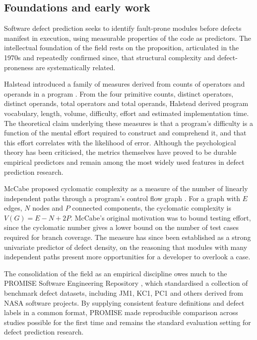 \documentclass[12pt,a4paper,oneside]{report}
\begin{document}
\subsection{Foundations and early work}

Software defect prediction seeks to identify fault-prone modules before defects manifest in execution, using measurable properties of the code as predictors. The intellectual foundation of the field rests on the proposition, articulated in the 1970s and repeatedly confirmed since, that structural complexity and defect-proneness are systematically related.

Halstead introduced a family of measures derived from counts of operators and operands in a program \cite{halstead1977}. From the four primitive counts, distinct operators, distinct operands, total operators and total operands, Halstead derived program vocabulary, length, volume, difficulty, effort and estimated implementation time. The theoretical claim underlying these measures is that a program's difficulty is a function of the mental effort required to construct and comprehend it, and that this effort correlates with the likelihood of error. Although the psychological theory has been criticised, the metrics themselves have proved to be durable empirical predictors and remain among the most widely used features in defect prediction research.

McCabe proposed cyclomatic complexity as a measure of the number of linearly independent paths through a program's control flow graph \cite{mccabe1976}. For a graph with $E$ edges, $N$ nodes and $P$ connected components, the cyclomatic complexity is $V(G) = E - N + 2P$. McCabe's original motivation was to bound testing effort, since the cyclomatic number gives a lower bound on the number of test cases required for branch coverage. The measure has since been established as a strong univariate predictor of defect density, on the reasoning that modules with many independent paths present more opportunities for a developer to overlook a case.

The consolidation of the field as an empirical discipline owes much to the PROMISE Software Engineering Repository \cite{promise}, which standardised a collection of benchmark defect datasets, including JM1, KC1, PC1 and others derived from NASA software projects. By supplying consistent feature definitions and defect labels in a common format, PROMISE made reproducible comparison across studies possible for the first time and remains the standard evaluation setting for defect prediction research.
\end{document}
